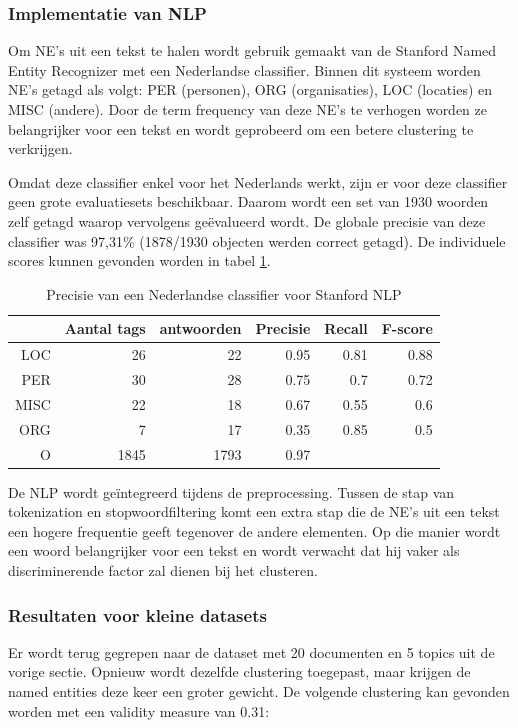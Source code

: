 \subsubsection{Implementatie van NLP}
Om NE's uit een tekst te halen wordt gebruik gemaakt van de Stanford Named Entity Recognizer \cite{Finkel2005} met een Nederlandse classifier. Binnen dit systeem worden NE's getagd als volgt: PER (personen), ORG (organisaties), LOC (locaties) en MISC (andere). Door de term frequency van deze NE's te verhogen worden ze belangrijker voor een tekst en wordt geprobeerd om een betere clustering te verkrijgen. 

Omdat deze classifier enkel voor het Nederlands werkt, zijn er voor deze classifier geen grote evaluatiesets beschikbaar. Daarom wordt een set van 1930 woorden zelf getagd waarop vervolgens ge\"evalueerd wordt. De globale precisie van deze classifier was 97,31\% (1878/1930 objecten werden correct getagd). De individuele scores kunnen gevonden worden in tabel \ref{tab:nlp-classifier}. 

\begin{table}[htbp]
  \caption{Precisie van een Nederlandse classifier voor Stanford NLP}
  \centering
    \begin{tabular}{rrrrrr}
    \toprule
          & Aantal tags & antwoorden & Precisie & Recall & F-score \\
    \midrule
    LOC   & 26    & 22    & 0.95  & 0.81  & 0.88 \\
    PER   & 30    & 28    & 0.75  & 0.7   & 0.72 \\
    MISC  & 22    & 18    & 0.67  & 0.55  & 0.6 \\
    ORG   & 7     & 17    & 0.35  & 0.85  & 0.5 \\
    O     & 1845  & 1793  & 0.97  &       &  \\
    \bottomrule
    \end{tabular}%
  \label{tab:nlp-classifier}%
\end{table}%

De NLP wordt ge\"integreerd tijdens de preprocessing. Tussen de stap van tokenization en stopwoordfiltering komt een extra stap die de NE's uit een tekst een hogere frequentie geeft tegenover de andere elementen. Op die manier wordt een woord belangrijker voor een tekst en wordt verwacht dat hij vaker als discriminerende factor zal dienen bij het clusteren. 

\subsubsection{Resultaten voor kleine datasets}
Er wordt terug gegrepen naar de dataset met 20 documenten en 5 topics uit de vorige sectie. Opnieuw wordt dezelfde clustering toegepast, maar krijgen de named entities deze keer een groter gewicht. De volgende clustering kan gevonden worden met een validity measure van 0.31:
\\

